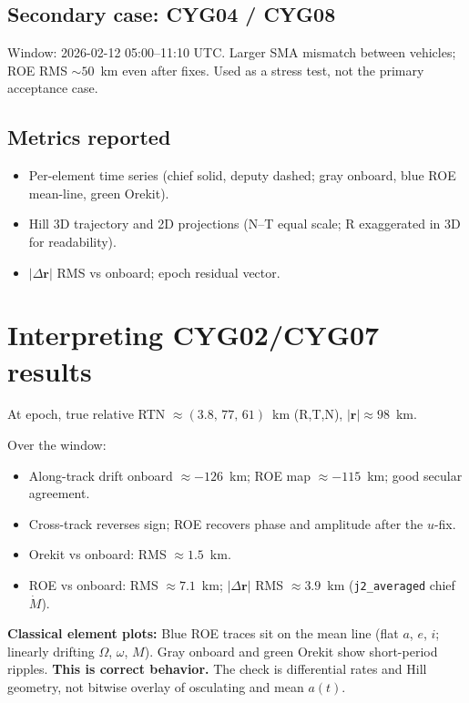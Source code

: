 \documentclass[11pt]{article}
\begin{document}
\subsection{Secondary case: CYG04 / CYG08}

Window: 2026-02-12 05:00--11:10 UTC. Larger SMA mismatch between vehicles; ROE RMS $\sim 50$~km even after fixes. Used as a stress test, not the primary acceptance case.

\subsection{Metrics reported}

\begin{itemize}
    \item Per-element time series (chief solid, deputy dashed; gray onboard, blue ROE mean-line, green Orekit).
    \item Hill 3D trajectory and 2D projections (N--T equal scale; R exaggerated in 3D for readability).
    \item $|\Delta\mathbf{r}|$ RMS vs onboard; epoch residual vector.
\end{itemize}

\section{Interpreting CYG02/CYG07 results}

At epoch, true relative RTN $\approx (3.8,\,77,\,61)$~km (R,T,N), $|\mathbf{r}| \approx 98$~km.

Over the window:
\begin{itemize}
    \item Along-track drift onboard $\approx -126$~km; ROE map $\approx -115$~km; good secular agreement.
    \item Cross-track reverses sign; ROE recovers phase and amplitude after the $u$-fix.
    \item Orekit vs onboard: RMS $\approx 1.5$~km.
    \item ROE vs onboard: RMS $\approx 7.1$~km; $| \Delta\mathbf{r}|$ RMS $\approx 3.9$~km (\texttt{j2\_averaged} chief $\dot M$).
\end{itemize}

\textbf{Classical element plots:} Blue ROE traces sit on the mean line (flat $a$, $e$, $i$; linearly drifting $\Omega$, $\omega$, $M$). Gray onboard and green Orekit show short-period ripples. \textbf{This is correct behavior.} The check is differential rates and Hill geometry, not bitwise overlay of osculating and mean $a(t)$.
\end{document}
